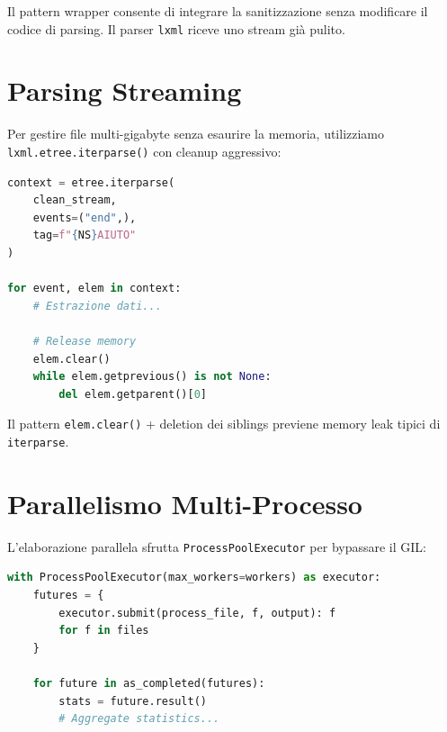 \begin{tipbox}
Il pattern wrapper consente di integrare la sanitizzazione senza modificare il codice di parsing. Il parser \texttt{lxml} riceve uno stream già pulito.
\end{tipbox}

\section{Parsing Streaming}

Per gestire file multi-gigabyte senza esaurire la memoria, utilizziamo \texttt{lxml.etree.iterparse()} con cleanup aggressivo:

\begin{lstlisting}[language=Python, caption=Iterparse con memory management]
context = etree.iterparse(
    clean_stream, 
    events=("end",), 
    tag=f"{NS}AIUTO"
)

for event, elem in context:
    # Estrazione dati...
    
    # Release memory
    elem.clear()
    while elem.getprevious() is not None:
        del elem.getparent()[0]
\end{lstlisting}

Il pattern \texttt{elem.clear()} + deletion dei siblings previene memory leak tipici di \texttt{iterparse}.

\section{Parallelismo Multi-Processo}

L'elaborazione parallela sfrutta \texttt{ProcessPoolExecutor} per bypassare il GIL:

\begin{lstlisting}[language=Python, caption=Orchestrazione parallela]
with ProcessPoolExecutor(max_workers=workers) as executor:
    futures = {
        executor.submit(process_file, f, output): f 
        for f in files
    }
    
    for future in as_completed(futures):
        stats = future.result()
        # Aggregate statistics...
\end{lstlisting}

